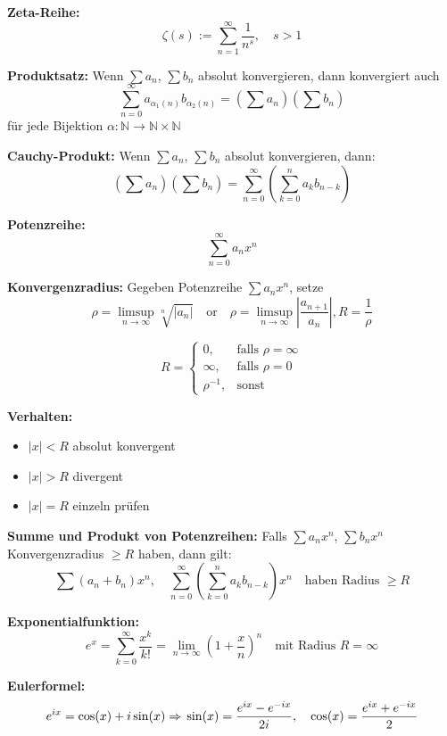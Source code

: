 \textbf{Zeta-Reihe:}  
\[
\zeta(s) := \sum_{n=1}^\infty \frac{1}{n^s}, \quad s > 1
\]

\textbf{Produktsatz:}  
Wenn \( \sum a_n \), \( \sum b_n \) absolut konvergieren, dann konvergiert auch  
\[
\sum_{n=0}^\infty a_{\alpha_1(n)} b_{\alpha_2(n)}
= \left( \sum a_n \right)\left( \sum b_n \right)
\]
für jede Bijektion \( \alpha: \mathbb{N} \to \mathbb{N} \times \mathbb{N} \)

\textbf{Cauchy-Produkt:}  
Wenn \( \sum a_n \), \( \sum b_n \) absolut konvergieren, dann:
\[
\left( \sum a_n \right) \left( \sum b_n \right)
= \sum_{n=0}^\infty \left( \sum_{k=0}^n a_k b_{n-k} \right)
\]

\textbf{Potenzreihe:}  
\[
\sum_{n=0}^\infty a_n x^n
\]

\textbf{Konvergenzradius:}  
Gegeben Potenzreihe \( \sum a_n x^n \), setze
\[
\rho = \limsup_{n \to \infty} \sqrt[n]{|a_n|} \quad \text{or} \quad
\rho = \limsup_{n \to \infty} \left| \frac{a_{n+1}}{a_n} \right|,
R = \frac{1}{\rho}
\]

\[
R =
\begin{cases}
0, & \text{falls } \rho = \infty \\
\infty, & \text{falls } \rho = 0 \\
\rho^{-1}, & \text{sonst}
\end{cases}
\]

\textbf{Verhalten:}
\begin{itemize}
  \item \( |x| < R \) \quad absolut konvergent
  \item \( |x| > R \) \quad divergent
  \item \( |x| = R \) \quad einzeln prüfen
\end{itemize}

\vspace{0.5em}

\textbf{Summe und Produkt von Potenzreihen:}  
Falls \( \sum a_n x^n \), \( \sum b_n x^n \) Konvergenzradius \( \geq R \) haben, dann gilt:
\[
\sum (a_n + b_n)x^n, \quad
\sum_{n=0}^\infty \left( \sum_{k=0}^n a_k b_{n-k} \right) x^n
\quad \text{haben Radius } \geq R
\]

\vspace{0.5em}

\textbf{Exponentialfunktion:}
\[
e^x = \sum_{k=0}^\infty \frac{x^k}{k!} = \lim_{n \to \infty} \left(1 + \frac{x}{n}\right)^n
\quad \text{mit Radius } R = \infty
\]

\textbf{Eulerformel:}  
\[
e^{ix} = \cos(x) + i \sin(x)
\Rightarrow \\
\sin(x) = \frac{e^{ix} - e^{-ix}}{2i}, \quad
\cos(x) = \frac{e^{ix} + e^{-ix}}{2}
\]


